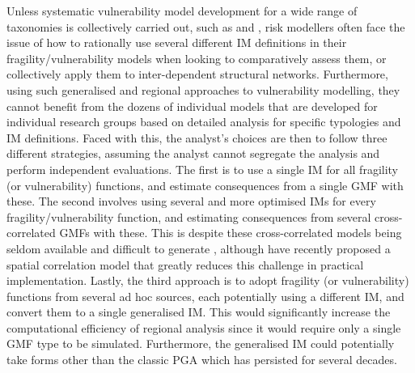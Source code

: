 Unless systematic vulnerability model development for a wide range of taxonomies is collectively carried out, such as \citet{Martins2021-BEE} and \citet{ESRM20}, risk modellers often face the issue of how to rationally use several different \ac{IM} definitions in their fragility/vulnerability models when looking to comparatively assess them, or collectively apply them to inter-dependent structural networks. Furthermore, using such generalised and regional approaches to vulnerability modelling, they cannot benefit from the dozens of individual models that are developed for individual research groups based on detailed analysis for specific typologies and \ac{IM} definitions. Faced with this, the analyst's choices are then to follow three different strategies, assuming the analyst cannot segregate the analysis and perform independent evaluations. The first is to use a single \ac{IM} for all fragility (or vulnerability) functions, and estimate consequences from a single \ac{GMF} with these. The second involves using several and more optimised \acp{IM} for every fragility/vulnerability function, and estimating consequences from several cross-correlated \acp{GMF} with these. This is despite these cross-correlated models being seldom available and difficult to generate \citep{MonteiroOReilly2026}, although \citet{Monteiro2026b} have recently proposed a spatial correlation model that greatly reduces this challenge in practical implementation. Lastly, the third approach is to adopt fragility (or vulnerability) functions from several ad hoc sources, each potentially using a different \ac{IM}, and convert them to a single generalised \ac{IM}. This would significantly increase the computational efficiency of regional analysis since it would require only a single \ac{GMF} type to be simulated. Furthermore, the generalised \ac{IM} could potentially take forms other than the classic \ac{PGA} which has persisted for several decades.

